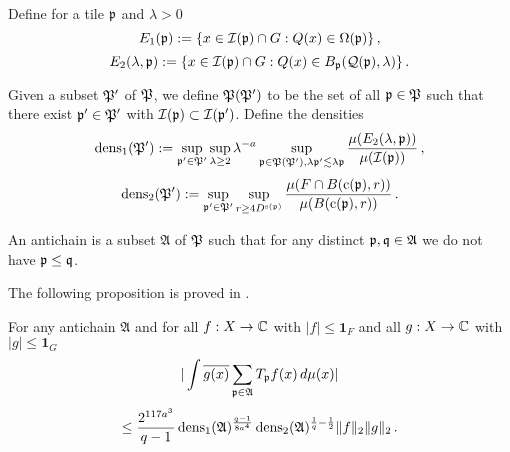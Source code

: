 Define for a tile ${\mathfrak p}$ and $\lambda>0$
\begin{equation}\label{definee1}
    E_1({\mathfrak p}):=\{x\in {\mathcal{I}}({\mathfrak p})\cap G: {Q}(x)\in {\Omega}({\mathfrak p})\}\, ,
\end{equation}
\begin{equation}\label{definee2}
    E_2(\lambda, {\mathfrak p}):=\{x\in {\mathcal{I}}({\mathfrak p})\cap G: {Q}(x)\in B_{{\mathfrak p}}({\mathcal{Q}}({\mathfrak p}), \lambda)\}\, .
\end{equation}



Given a subset ${\mathfrak P}'$ of ${\mathfrak P}$, we define
${\mathfrak P}({\mathfrak P}')$ to be the set of
all ${\mathfrak p} \in {\mathfrak P}$ such that there exist ${\mathfrak p}' \in {\mathfrak P}'$ with ${\mathcal{I}}({\mathfrak p})\subset {\mathcal{I}}({\mathfrak p}')$. Define the densities
\begin{equation}\label{definedens1}
    {\operatorname{\operatorname{dens}}}_1({\mathfrak P}') := \sup_{{\mathfrak p}'\in {\mathfrak P}'}\sup_{\lambda \geq 2} \lambda^{-a} \sup_{{\mathfrak p} \in {\mathfrak P}({\mathfrak P}'), \lambda {\mathfrak p}' \lesssim \lambda {\mathfrak p}}
    \frac{\mu({E}_2(\lambda, {\mathfrak p}))}{\mu({\mathcal{I}}({\mathfrak p}))}\, ,
\end{equation}
\begin{equation}\label{definedens2}
    {\operatorname{\operatorname{dens}}}_2({\mathfrak P}') := \sup_{{\mathfrak p}'\in {\mathfrak P}'}
    \sup_{r\ge 4D^{{\mathrm{s}}({\mathfrak p})}}
    \frac{\mu(F\cap B({\mathrm{c}}({\mathfrak p}),r))}{\mu(B({\mathrm{c}}({\mathfrak p}),r))}\, .
\end{equation}





An antichain is a subset $\mathfrak{A}$
of ${\mathfrak P}$ such that for any distinct ${\mathfrak p},{\mathfrak q}\in \mathfrak{A}$ we do not have ${\mathfrak p}\le {\mathfrak q}$.

The following proposition is proved in .

\begin{proposition}
\label{antichain-operator}
\leanok
{}

For any antichain $\mathfrak{A} $ and for all $f:X\to \mathbb{C}$ with $|f|\le \mathbf{1}_F$ and all $g:X\to\mathbb{C}$ with $|g| \le \mathbf{1}_G$
\begin{equation} \label{eq-antiprop}
    |\int \overline{g(x)} \sum_{{\mathfrak p} \in \mathfrak{A}} T_{{\mathfrak p}} f(x)\, d\mu(x)|
\end{equation}
\begin{equation}
    \le \frac{2^{117a^3}}{q-1} \operatorname{\operatorname{dens}}_1(\mathfrak{A})^{\frac {q-1}{8a^4}}\operatorname{\operatorname{dens}}_2(\mathfrak{A})^{\frac 1{q}-\frac 12} \|f\|_2 \|g\|_2\, .
\end{equation}
\end{proposition}

